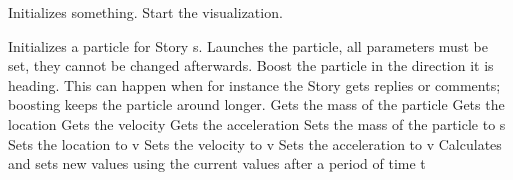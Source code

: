 \begin{interface}
    {Initializes something.}
    {Start the visualization.}
    {}
\end{interface}




\begin{classmetadata}
\end{classmetadata}

\begin{interface}
    {Initializes a particle for Story s.}
    {Launches the particle, all parameters must be set, they cannot be changed
      afterwards.}
    {Boost the particle in the direction it is heading. This can happen when
      for instance the Story gets replies or comments; boosting keeps the
      particle around longer.}
    {Gets the mass of the particle}
    {Gets the location}
    {Gets the velocity}
    {Gets the acceleration}
    {Sets the mass of the particle to s}
    {Sets the location to v}
    {Sets the velocity to v}
    {Sets the acceleration to v}
    {Calculates and sets new values using the current values after a period of
      time t}
\end{interface}




\begin{classmetadata}
\end{classmetadata}



